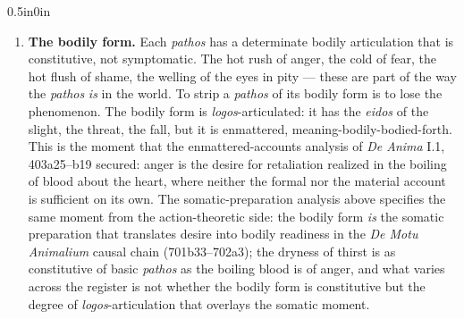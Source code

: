 \documentclass{article}
\begin{document}
\begin{adjustwidth}{0.5in}{0in}
\begin{enumerate}
        \item \textbf{The bodily form.} Each \textit{pathos} has a determinate bodily articulation that is constitutive, not symptomatic. The hot rush of anger, the cold of fear, the hot flush of shame, the welling of the eyes in pity --- these are part of the way the \textit{pathos} \textit{is} in the world. To strip a \textit{pathos} of its bodily form is to lose the phenomenon. The bodily form is \textit{logos}-articulated: it has the \textit{eidos} of the slight, the threat, the fall, but it is enmattered, meaning-bodily-bodied-forth. This is the moment that the enmattered-accounts analysis of \textit{De Anima} I.1, 403a25--b19 secured: anger is the desire for retaliation realized in the boiling of blood about the heart, where neither the formal nor the material account is sufficient on its own. The somatic-preparation analysis above specifies the same moment from the action-theoretic side: the bodily form \textit{is} the somatic preparation that translates desire into bodily readiness in the \textit{De Motu Animalium} causal chain (701b33--702a3); the dryness of thirst is as constitutive of basic \textit{pathos} as the boiling blood is of anger, and what varies across the register is not whether the bodily form is constitutive but the degree of \textit{logos}-articulation that overlays the somatic moment.
        

\end{enumerate}
\end{adjustwidth}
\end{document}

